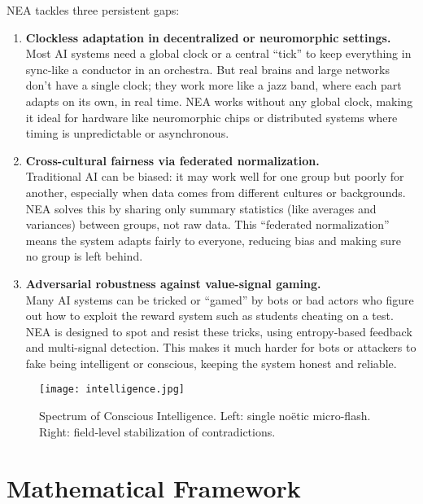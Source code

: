 \documentclass[11pt]{article}
\begin{document}
NEA tackles three persistent gaps:

\begin{enumerate}[label=\textbf{C\arabic*},itemsep=2pt]
  \item \textbf{Clockless adaptation in decentralized or neuromorphic settings.} \\
  Most AI systems need a global clock or a central “tick” to keep everything in sync-like a conductor in an orchestra. But real brains and large networks don’t have a single clock; they work more like a jazz band, where each part adapts on its own, in real time. NEA works without any global clock, making it ideal for hardware like neuromorphic chips or distributed systems where timing is unpredictable or asynchronous.
  
  \item \textbf{Cross-cultural fairness via federated normalization.} \\
  Traditional AI can be biased: it may work well for one group but poorly for another, especially when data comes from different cultures or backgrounds. NEA solves this by sharing only summary statistics (like averages and variances) between groups, not raw data. This “federated normalization” means the system adapts fairly to everyone, reducing bias and making sure no group is left behind.
  
  \item \textbf{Adversarial robustness against value-signal gaming.} \\
  Many AI systems can be tricked or “gamed” by bots or bad actors who figure out how to exploit the reward system such as students cheating on a test. NEA is designed to spot and resist these tricks, using entropy-based feedback and multi-signal detection. This makes it much harder for bots or attackers to fake being intelligent or conscious, keeping the system honest and reliable.
\end{enumerate}

\begin{figure}[!htb]
  \centering
  \texttt{[image: intelligence.jpg]}
  \caption{Spectrum of Conscious Intelligence.
    Left: single no\"etic micro-flash.
    Right: field‐level stabilization of contradictions.}
  \label{fig:spectrum}
\end{figure}

\section{Mathematical Framework}
\label{sec:math}
\end{document}
